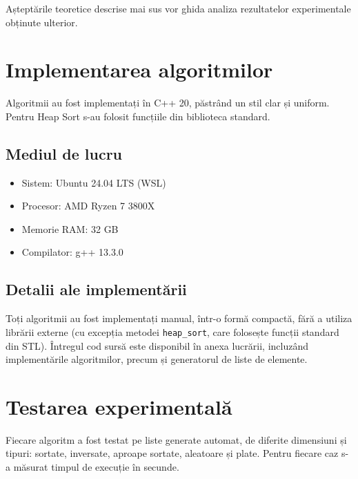 \documentclass{article}
\begin{document}
\vspace{0.5cm}

Așteptările teoretice descrise mai sus vor ghida analiza rezultatelor experimentale obținute ulterior.

\section{Implementarea algoritmilor}
Algoritmii au fost implementați în C++ 20, păstrând un stil clar și uniform. Pentru Heap Sort s-au folosit funcțiile din biblioteca standard.

\subsection{Mediul de lucru}
\begin{itemize}
    \item Sistem: Ubuntu 24.04 LTS (WSL)
    \item Procesor: AMD Ryzen 7 3800X
    \item Memorie RAM: 32 GB
    \item Compilator: g++ 13.3.0
\end{itemize}


\subsection{Detalii ale implementării}

Toți algoritmii au fost implementați manual, într-o formă compactă, fără a utiliza librării externe (cu excepția metodei \texttt{heap\_sort}, care folosește funcții standard din STL). Întregul cod sursă este disponibil în anexa lucrării, incluzând implementările algoritmilor, precum și generatorul de liste de elemente.

\vspace{0.5cm}

\section{Testarea experimentală}
Fiecare algoritm a fost testat pe liste generate automat, de diferite dimensiuni și tipuri: sortate, inversate, aproape sortate, aleatoare și plate. Pentru fiecare caz s-a măsurat timpul de execuție în secunde.
\end{document}
